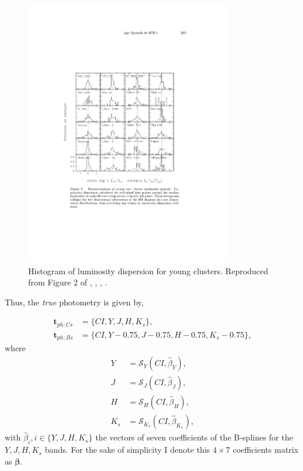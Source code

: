 \begin{figure}[ht!]
\begin{center}
\includegraphics[width=0.8\textwidth]{background/Figures/F2_Hillenbrand2008.pdf}
\caption{Histogram of luminosity dispersion for young clusters. Reproduced from Figure 2 of \citet{2008ASPC..384..200H}, \textit{}, , .}
\label{fig:luminosity_dispersion}
\end{center}
\end{figure}


Thus, the \emph{true} photometry is given by,

\begin{align}
\mathbf{t}_{ph;Cs}&= \{CI,Y,J,H,K_s\},\nonumber \\
\mathbf{t}_{ph;Bs}&=\{CI,Y-0.75,J-0.75,H-0.75,K_s-0.75\}, \nonumber
\end{align}
where
\begin{align}
Y &=\mathcal{S}_Y(CI,\hat{\beta}_Y), \nonumber \\
J &=\mathcal{S}_J(CI,\hat{\beta}_J),\nonumber \\
 H &=\mathcal{S}_H(CI,\hat{\beta}_H), \nonumber \\
 K_s &=\mathcal{S}_{K_s}(CI,\hat{\beta}_{K_s}),  \nonumber 
\end{align}
with $\hat{\beta}_{i}, i\in\{Y,J,H,K_s\}$ the vectors of seven coefficients of the B-splines for the $Y,J,H,K_s$ bands.  For the sake of simplicity I denote this $4\times7$ coefficients matrix as $\boldsymbol{\beta}$.

